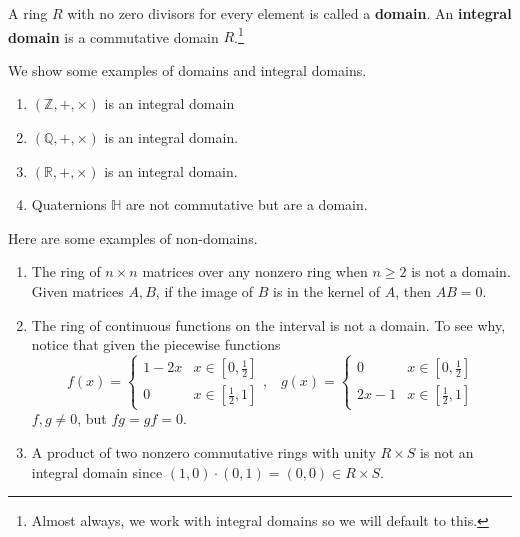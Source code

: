   \begin{definition}
    A ring $R$ with no zero divisors for every element is called a \textbf{domain}. An \textbf{integral domain} is a commutative domain $R$.\footnote{Almost always, we work with integral domains so we will default to this.} 
  \end{definition} 

  \begin{example}
    We show some examples of domains and integral domains. 
    \begin{enumerate}
      \item $(\mathbb{Z}, +, \times)$ is an integral domain
      \item $(\mathbb{Q}, +, \times)$ is an integral domain. 
      \item $(\mathbb{R}, +, \times)$ is an integral domain. 
      \item Quaternions $\mathbb{H}$ are not commutative but are a domain. 
    \end{enumerate}
  \end{example} 

  \begin{example}
    Here are some examples of non-domains. 
    \begin{enumerate}
      \item The ring of $n \times n$ matrices over any nonzero ring when $ n \geq 2$ is not a domain. Given matrices $A, B$, if the image of $B$ is in the kernel of $A$, then $A B = 0$.
      \item The ring of continuous functions on the interval is not a domain. To see why, notice that given the piecewise functions 
      \begin{equation}
        f (x) = \begin{cases}
        1 - 2x & x \in [0, \frac{1}{2}] \\
        0 & x \in [\frac{1}{2}, 1] 
        \end{cases}, \; \;\;g (x) = \begin{cases}
        0 & x \in [0, \frac{1}{2}] \\
        2x - 1 & x \in [\frac{1}{2}, 1] 
        \end{cases}
      \end{equation}
      $f, g \neq 0$, but $f g = g f = 0$. 

      \item A product of two nonzero commutative rings with unity $R \times S$ is not an integral domain since $(1,0) \cdot (0, 1) = (0, 0) \in R \times S$. 
    \end{enumerate}
  \end{example}

